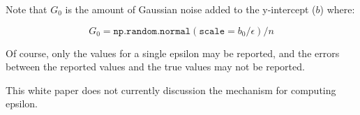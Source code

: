\documentclass{article}
\begin{document}
Note that $G_0$ is the amount of Gaussian noise added to the
y-intercept ($b$) where:

\begin{equation}
G_0 = \texttt{np.random.normal}(\texttt{scale}=b_0/\epsilon) / n
\end{equation}



{\small\noindent

}

Of course, only the values for a single epsilon may be reported, and
the errors between the reported values and the true values may not be reported. 

This white paper does not currently discussion the mechanism for
computing epsilon. 
\end{document}

